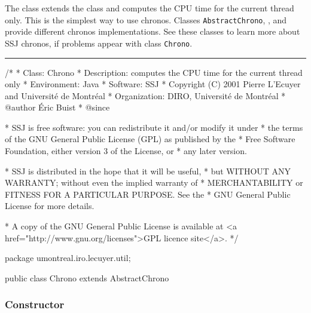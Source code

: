 
The  class extends the 
class and computes the CPU time for the current thread only.
This is the simplest way to use chronos. Classes \texttt{AbstractChrono},
, 
 and 
provide different chronos implementations.
See these classes to learn more about SSJ chronos, if problems appear with
class \texttt{Chrono}.

\bigskip\hrule
\begin{code}
\begin{hide}
/*
 * Class:        Chrono
 * Description:  computes the CPU time for the current thread only
 * Environment:  Java
 * Software:     SSJ 
 * Copyright (C) 2001  Pierre L'Ecuyer and Université de Montréal
 * Organization: DIRO, Université de Montréal
 * @author       Éric Buist
 * @since

 * SSJ is free software: you can redistribute it and/or modify it under
 * the terms of the GNU General Public License (GPL) as published by the
 * Free Software Foundation, either version 3 of the License, or
 * any later version.

 * SSJ is distributed in the hope that it will be useful,
 * but WITHOUT ANY WARRANTY; without even the implied warranty of
 * MERCHANTABILITY or FITNESS FOR A PARTICULAR PURPOSE.  See the
 * GNU General Public License for more details.

 * A copy of the GNU General Public License is available at
   <a href="http://www.gnu.org/licenses">GPL licence site</a>.
 */
\end{hide}
package umontreal.iro.lecuyer.util;


public class Chrono extends AbstractChrono \begin{hide} {
   private ThreadCPUTimeChrono chrono = new ThreadCPUTimeChrono();

   protected void getTime (long[] tab) {
         chrono.getTime(tab);
   }\end{hide}
\end{code}

\subsubsection*{Constructor}

